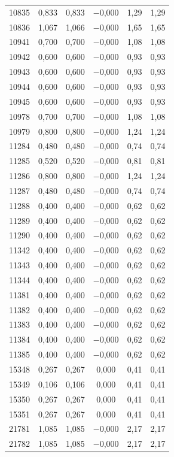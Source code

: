 \begin{longtable}{lccccc}
10835 & 0,833 & 0,833 & $-$0,000 & 1,29 & 1,29 \\
10836 & 1,067 & 1,066 & $-$0,000 & 1,65 & 1,65 \\
10941 & 0,700 & 0,700 & $-$0,000 & 1,08 & 1,08 \\
10942 & 0,600 & 0,600 & $-$0,000 & 0,93 & 0,93 \\
10943 & 0,600 & 0,600 & $-$0,000 & 0,93 & 0,93 \\
10944 & 0,600 & 0,600 & $-$0,000 & 0,93 & 0,93 \\
10945 & 0,600 & 0,600 & $-$0,000 & 0,93 & 0,93 \\
10978 & 0,700 & 0,700 & $-$0,000 & 1,08 & 1,08 \\
10979 & 0,800 & 0,800 & $-$0,000 & 1,24 & 1,24 \\
11284 & 0,480 & 0,480 & $-$0,000 & 0,74 & 0,74 \\
11285 & 0,520 & 0,520 & $-$0,000 & 0,81 & 0,81 \\
11286 & 0,800 & 0,800 & $-$0,000 & 1,24 & 1,24 \\
11287 & 0,480 & 0,480 & $-$0,000 & 0,74 & 0,74 \\
11288 & 0,400 & 0,400 & $-$0,000 & 0,62 & 0,62 \\
11289 & 0,400 & 0,400 & $-$0,000 & 0,62 & 0,62 \\
11290 & 0,400 & 0,400 & $-$0,000 & 0,62 & 0,62 \\
11342 & 0,400 & 0,400 & $-$0,000 & 0,62 & 0,62 \\
11343 & 0,400 & 0,400 & $-$0,000 & 0,62 & 0,62 \\
11344 & 0,400 & 0,400 & $-$0,000 & 0,62 & 0,62 \\
11381 & 0,400 & 0,400 & $-$0,000 & 0,62 & 0,62 \\
11382 & 0,400 & 0,400 & $-$0,000 & 0,62 & 0,62 \\
11383 & 0,400 & 0,400 & $-$0,000 & 0,62 & 0,62 \\
11384 & 0,400 & 0,400 & $-$0,000 & 0,62 & 0,62 \\
11385 & 0,400 & 0,400 & $-$0,000 & 0,62 & 0,62 \\
15348 & 0,267 & 0,267 & 0,000 & 0,41 & 0,41 \\
15349 & 0,106 & 0,106 & 0,000 & 0,41 & 0,41 \\
15350 & 0,267 & 0,267 & 0,000 & 0,41 & 0,41 \\
15351 & 0,267 & 0,267 & 0,000 & 0,41 & 0,41 \\
21781 & 1,085 & 1,085 & $-$0,000 & 2,17 & 2,17 \\
21782 & 1,085 & 1,085 & $-$0,000 & 2,17 & 2,17 \\

\end{longtable}
